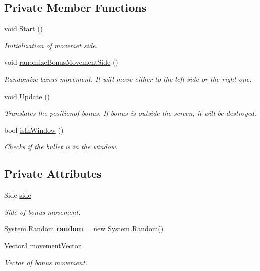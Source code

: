 \subsection*{Private Member Functions}
\begin{DoxyCompactItemize}
\item 
void \mbox{\hyperlink{class_bonus_movement_af3228316fa495638dcdb186e09e5649a}{Start}} ()
\begin{DoxyCompactList}\small\item\em Initialization of movemet side. \end{DoxyCompactList}\item 
void \mbox{\hyperlink{class_bonus_movement_adf840dc4aa70ab5a73860849f1299785}{ranomize\+Bonus\+Movement\+Side}} ()
\begin{DoxyCompactList}\small\item\em Randomize bonus movement. It will move either to the left side or the right one. \end{DoxyCompactList}\item 
void \mbox{\hyperlink{class_bonus_movement_a11644c2fe7b847b9d7710378a48a48d6}{Update}} ()
\begin{DoxyCompactList}\small\item\em Translates the positionof bonus. If bonus is outside the screen, it will be destroyed. \end{DoxyCompactList}\item 
bool \mbox{\hyperlink{class_bonus_movement_ad4a51d66472b7d98a7813fca3c2cb626}{is\+In\+Window}} ()
\begin{DoxyCompactList}\small\item\em Checks if the bullet is in the window. \end{DoxyCompactList}\end{DoxyCompactItemize}
\subsection*{Private Attributes}
\begin{DoxyCompactItemize}
\item 
Side \mbox{\hyperlink{class_bonus_movement_a6e42122052649933fe8e7bb8d50314c7}{side}}
\begin{DoxyCompactList}\small\item\em Side of bonus movement. \end{DoxyCompactList}\item 
\mbox{\label{class_bonus_movement_a82195764de7f3cd02f2fe40077cc4f7a}} 
System.\+Random {\bfseries random} = new System.\+Random()
\item 
Vector3 \mbox{\hyperlink{class_bonus_movement_a8f34e489370f3d6538641b3f44b2c77c}{movement\+Vector}}
\begin{DoxyCompactList}\small\item\em Vector of bonus movement. \end{DoxyCompactList}\end{DoxyCompactItemize}


